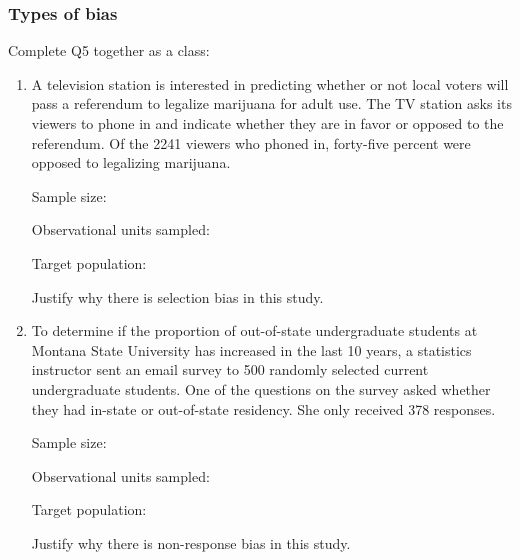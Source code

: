 \documentclass[
]{report}
\begin{document}
\vspace{5in}

\newpage

\subsubsection*{Types of bias}\label{types-of-bias}

Complete Q5 together as a class:

\begin{enumerate}
\def\labelenumi{\arabic{enumi}.}
\setcounter{enumi}{4}
\item
  A television station is interested in predicting whether or not local voters will pass a referendum to legalize marijuana for adult use. The TV station asks its viewers to phone in and indicate whether they are in favor or opposed to the referendum. Of the 2241 viewers who phoned in, forty-five percent were opposed to legalizing marijuana.
  \vspace{0.1in}

  Sample size:
  \vspace{0.3in}

  Observational units sampled:
  \vspace{0.3in}

  Target population:
  \vspace{0.3in}

  Justify why there is selection bias in this study.
  \vspace{0.5in}
\item
  To determine if the proportion of out-of-state undergraduate students at Montana State University has increased in the last 10 years, a statistics instructor sent an email survey to 500 randomly selected current undergraduate students. One of the questions on the survey asked whether they had in-state or out-of-state residency. She only received 378 responses.
  \vspace{0.1in}

  Sample size:
  \vspace{0.3in}

  Observational units sampled:
  \vspace{0.3in}

  Target population:
  \vspace{0.3in}

  Justify why there is non-response bias in this study.
  \vspace{0.5in}
\end{enumerate}
\end{document}
